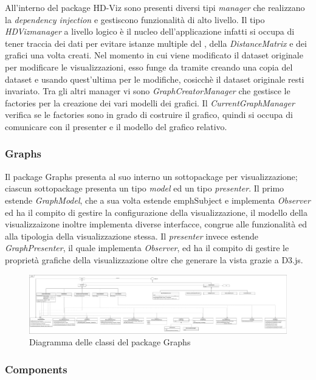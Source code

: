 \documentclass[../manuale_sviluppatore.tex]{subfiles}
\begin{document}
All'interno del package HD-Viz sono presenti diversi tipi \emph{manager} che realizzano la 
\emph{dependency injection} e gestiscono funzionalità di alto livello. Il tipo \emph{HDVizmanager} 
a livello logico è il nucleo dell'applicazione infatti si occupa di tener traccia dei dati per 
evitare istanze multiple del , della \emph{DistanceMatrix} e dei grafici una 
volta creati. Nel momento in cui viene modificato il dataset originale per modificare le 
visualizzazioni, esso funge da tramite creando una copia del dataset e usando quest'ultima per le 
modifiche, cosicchè il dataset originale resti invariato.
Tra gli altri manager vi sono \emph{GraphCreatorManager} che gestisce le factories per la 
creazione dei vari modelli dei grafici. Il \emph{CurrentGraphManager} verifica se le factories sono 
in grado di costruire il grafico, quindi si occupa di comunicare con il presenter e il modello del 
grafico relativo.

\subsubsection*{Graphs}

Il package Graphs presenta al suo interno un sottopackage per visualizzazione; ciascun sottopackage 
presenta un tipo \emph{model} ed un tipo \emph{presenter}. Il primo estende \emph{GraphModel}, che 
a sua volta estende emph{Subject} e implementa \emph{Observer} ed ha il compito di gestire la 
configurazione della visualizzazione, il modello della visualizzaizone inoltre implementa diverse 
interfacce, congrue alle  funzionalità ed alla tipologia della visualizzazione stessa. Il 
\emph{presenter} invece estende \emph{GraphPresenter}, il quale implementa \emph{Observer}, ed ha 
il compito di gestire le proprietà grafiche della visualizzazione oltre che generare la 
vista grazie a D3.js.

\begin{figure}[H]
	\centering
	\includegraphics[width=18cm]{src/img/graphs.pdf}
	\caption{Diagramma delle classi del package Graphs}
\end{figure}


\subsubsection*{Components}
\end{document}
